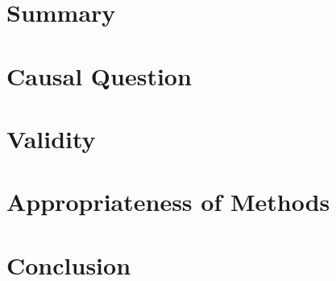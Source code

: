 \section{Summary}

\section{Causal Question}

\section{Validity}

\section{Appropriateness of Methods}

\section{Conclusion}
